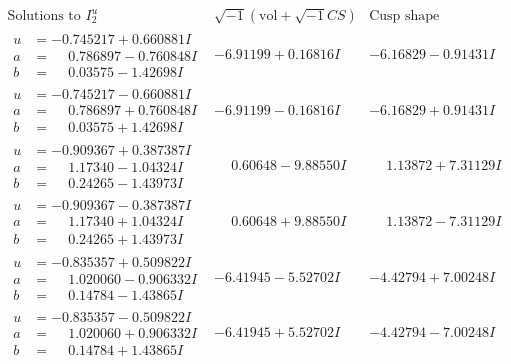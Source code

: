 \documentclass[1p]{elsarticle_modified}
\theoremstyle{definition}
\newcommand{\I}{\sqrt{-1}}
\begin{document}
$$\begin{array}{c|c|c}  
\text{Solutions to }I^u_{2}& \I (\text{vol} + \sqrt{-1}CS) & \text{Cusp shape}\\
 \hline 
\begin{aligned}
u &= -0.745217 + 0.660881 I \\
a &= \phantom{-}0.786897 - 0.760848 I \\
b &= \phantom{-}0.03575 - 1.42698 I\end{aligned}
 & -6.91199 + 0.16816 I & -6.16829 - 0.91431 I \\ \hline\begin{aligned}
u &= -0.745217 - 0.660881 I \\
a &= \phantom{-}0.786897 + 0.760848 I \\
b &= \phantom{-}0.03575 + 1.42698 I\end{aligned}
 & -6.91199 - 0.16816 I & -6.16829 + 0.91431 I \\ \hline\begin{aligned}
u &= -0.909367 + 0.387387 I \\
a &= \phantom{-}1.17340 - 1.04324 I \\
b &= \phantom{-}0.24265 - 1.43973 I\end{aligned}
 & \phantom{-}0.60648 - 9.88550 I & \phantom{-}1.13872 + 7.31129 I \\ \hline\begin{aligned}
u &= -0.909367 - 0.387387 I \\
a &= \phantom{-}1.17340 + 1.04324 I \\
b &= \phantom{-}0.24265 + 1.43973 I\end{aligned}
 & \phantom{-}0.60648 + 9.88550 I & \phantom{-}1.13872 - 7.31129 I \\ \hline\begin{aligned}
u &= -0.835357 + 0.509822 I \\
a &= \phantom{-}1.020060 - 0.906332 I \\
b &= \phantom{-}0.14784 - 1.43865 I\end{aligned}
 & -6.41945 - 5.52702 I & -4.42794 + 7.00248 I \\ \hline\begin{aligned}
u &= -0.835357 - 0.509822 I \\
a &= \phantom{-}1.020060 + 0.906332 I \\
b &= \phantom{-}0.14784 + 1.43865 I\end{aligned}
 & -6.41945 + 5.52702 I & -4.42794 - 7.00248 I \\ \hline\begin{aligned}

\end{aligned}
\end{array}$$
\end{document}
